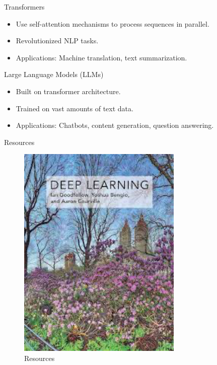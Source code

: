 \documentclass{beamer}
\begin{document}
\begin{frame}{Transformers}
    \begin{itemize}
        \item Use self-attention mechanisms to process sequences in parallel.
        \item Revolutionized NLP tasks.
        \item Applications: Machine translation, text summarization.
    \end{itemize}
\end{frame}

\begin{frame}{Large Language Models (LLMs)}
    \begin{itemize}
        \item Built on transformer architecture.
        \item Trained on vast amounts of text data.
        \item Applications: Chatbots, content generation, question answering.
    \end{itemize}
\end{frame}

\begin{frame}{Resources}
    \begin{figure}
        \centering
        \includegraphics[width=0.7\textwidth]{dl.png}
        \caption{Resources}
    \end{figure}
\end{frame}
\end{document}
